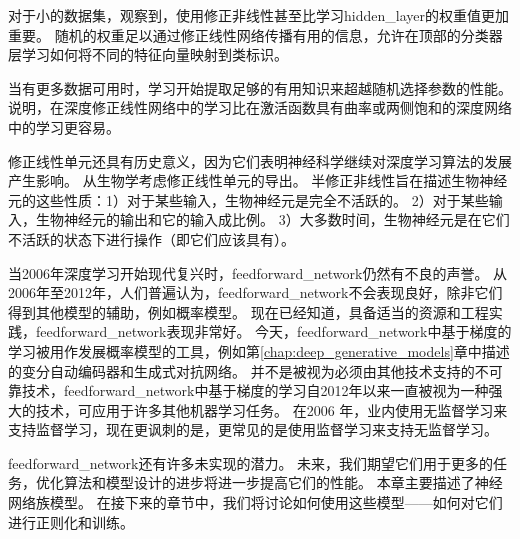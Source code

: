 对于小的数据集，\cite{Jarrett-ICCV2009-small}观察到，使用修正非线性甚至比学习\gls{hidden_layer}的权重值更加重要。
随机的权重足以通过修正线性网络传播有用的信息，允许在顶部的分类器层学习如何将不同的特征向量映射到类标识。

当有更多数据可用时，学习开始提取足够的有用知识来超越随机选择参数的性能。
\cite{Glorot+al-AI-2011-small}说明，在深度修正线性网络中的学习比在激活函数具有曲率或两侧饱和的深度网络中的学习更容易。

修正线性单元还具有历史意义，因为它们表明神经科学继续对深度学习算法的发展产生影响。
\cite{Glorot+al-AI-2011-small}从生物学考虑修正线性单元的导出。
半修正非线性旨在描述生物神经元的这些性质：1）对于某些输入，生物神经元是完全不活跃的。
2）对于某些输入，生物神经元的输出和它的输入成比例。
3）大多数时间，生物神经元是在它们不活跃的状态下进行操作（即它们应该具有）。
  
  
当2006年深度学习开始现代复兴时，\gls{feedforward_network}仍然有不良的声誉。
从2006年至2012年，人们普遍认为，\gls{feedforward_network}不会表现良好，除非它们得到其他模型的辅助，例如概率模型。
现在已经知道，具备适当的资源和工程实践，\gls{feedforward_network}表现非常好。
今天，\gls{feedforward_network}中基于梯度的学习被用作发展概率模型的工具，例如第\ref{chap:deep_generative_models}章中描述的变分自动编码器和生成式对抗网络。
并不是被视为必须由其他技术支持的不可靠技术，\gls{feedforward_network}中基于梯度的学习自2012年以来一直被视为一种强大的技术，可应用于许多其他机器学习任务。
在2006 年，业内使用无监督学习来支持监督学习，现在更讽刺的是，更常见的是使用监督学习来支持无监督学习。

\gls{feedforward_network}还有许多未实现的潜力。
未来，我们期望它们用于更多的任务，优化算法和模型设计的进步将进一步提高它们的性能。
本章主要描述了神经网络族模型。
在接下来的章节中，我们将讨论如何使用这些模型——如何对它们进行正则化和训练。

  
  
